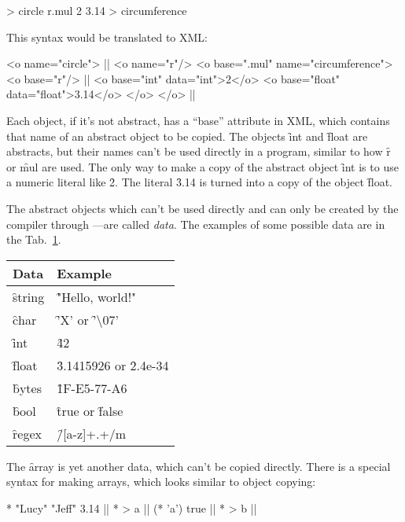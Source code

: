 \begin{eocode}
[r] > circle
  r.mul 2 3.14 > circumference
\end{eocode}

This syntax would be translated to XML:

\begin{eocode}
<o name="circle"> |$\label{ln:xml-circle}$|
  <o name="r"/>
  <o base=".mul" name="circumference">
    <o base="r"/>  |$\label{ln:xml-circle-r}$|
    <o base="int" data="int">2</o>
    <o base="float" data="float">3.14</o>
  </o>
</o> |$\label{ln:xml-circle-end}$|
\end{eocode}

Each object, if it's not abstract, has a ``base'' attribute in XML,
which contains that name of an abstract object to be copied. The
objects \f{int} and \f{float} are abstracts, but their names
can't be used directly in a program, similar to how \f{r} or \f{mul}
are used. The only way to make a copy of the abstract object \f{int}
is to use a numeric literal like \f{2}. The literal \f{3.14}
is turned into a copy of the object \f{float}.

The abstract objects which can't be used directly and can only be
created by the compiler through ---are called \emph{data}.
The examples of some possible data are in the Tab.~\ref{tab:types}.

\begin{table}[H]
\begin{tabular}{|l|l|}
\hline
Data & Example \\
\hline
\f{string} & \f{"Hello, world!"} \\
\f{char} & \f{'X'} or \f{'\textbackslash{}07'} \\
\f{int} & \f{42} \\
\f{float} & \f{3.1415926} or \f{2.4e-34} \\
\f{bytes} & \f{1F-E5-77-A6} \\
\f{bool} & \f{true} or \f{false} \\
\f{regex} & \f{/[a-z]+.+/m} \\
\hline
\end{tabular}
\label{tab:types}
\end{table}

The \f{array} is yet another data, which can't be copied
directly. There is a special syntax for making arrays,
which looks similar to object copying:

\begin{eocode}
* "Lucy" "Jeff" 3.14 |$\label{ln:array-1}$|
* > a |$\label{ln:array-2a}$|
  (* 'a')
  true |$\label{ln:array-2b}$|
* > b |$\label{ln:array-3}$|
\end{eocode}

